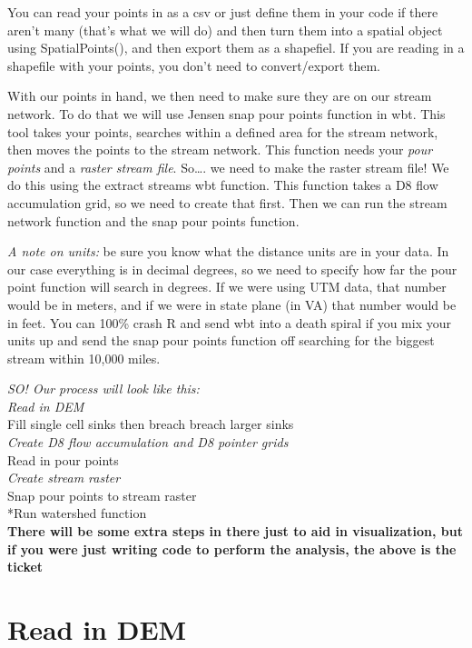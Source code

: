 \documentclass[
]{book}
\begin{document}
You can read your points in as a csv or just define them in your code if there aren't many (that's what we will do) and then turn them into a spatial object using SpatialPoints(), and then export them as a shapefiel. If you are reading in a shapefile with your points, you don't need to convert/export them.

With our points in hand, we then need to make sure they are on our stream network. To do that we will use Jensen snap pour points function in wbt. This tool takes your points, searches within a defined area for the stream network, then moves the points to the stream network. This function needs your \emph{pour points} and a \emph{raster stream file}. So\ldots. we need to make the raster stream file! We do this using the extract streams wbt function. This function takes a D8 flow accumulation grid, so we need to create that first. Then we can run the stream network function and the snap pour points function.

\emph{A note on units:} be sure you know what the distance units are in your data. In our case everything is in decimal degrees, so we need to specify how far the pour point function will search in degrees. If we were using UTM data, that number would be in meters, and if we were in state plane (in VA) that number would be in feet. You can 100\% crash R and send wbt into a death spiral if you mix your units up and send the snap pour points function off searching for the biggest stream within 10,000 miles.

\emph{SO! Our process will look like this:}\\
\emph{Read in DEM\\
}Fill single cell sinks then breach breach larger sinks\\
\emph{Create D8 flow accumulation and D8 pointer grids\\
}Read in pour points\\
\emph{Create stream raster\\
}Snap pour points to stream raster\\
*Run watershed function\\

\textbf{There will be some extra steps in there just to aid in visualization, but if you were just writing code to perform the analysis, the above is the ticket}

\hypertarget{read-in-dem-1}{%
\section{Read in DEM}\label{read-in-dem-1}}
\end{document}
